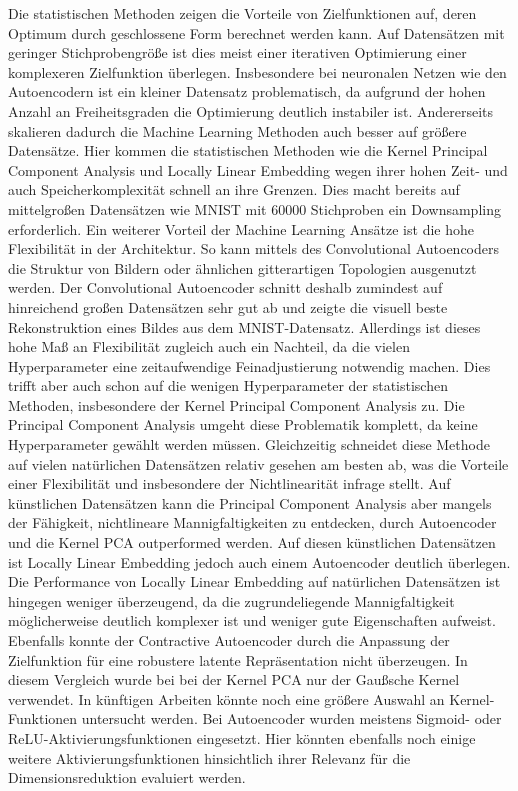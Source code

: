 Die statistischen Methoden zeigen die Vorteile von Zielfunktionen auf, deren Optimum durch
geschlossene Form berechnet werden kann. Auf Datensätzen mit geringer Stichprobengröße ist dies
meist einer iterativen Optimierung einer komplexeren Zielfunktion überlegen. Insbesondere bei
neuronalen Netzen wie den Autoencodern ist ein kleiner Datensatz problematisch, da aufgrund der
hohen Anzahl an Freiheitsgraden die Optimierung deutlich instabiler ist. Andererseits skalieren
dadurch die Machine Learning Methoden auch besser auf größere Datensätze. Hier kommen die
statistischen Methoden wie die Kernel Principal Component Analysis und Locally Linear Embedding
wegen ihrer hohen Zeit- und auch Speicherkomplexität schnell an ihre Grenzen. Dies macht bereits
auf mittelgroßen Datensätzen wie MNIST mit \num{60000} Stichproben ein Downsampling erforderlich.
Ein weiterer Vorteil der Machine Learning Ansätze ist die hohe Flexibilität in der Architektur. So
kann mittels des Convolutional Autoencoders die Struktur von Bildern oder ähnlichen gitterartigen
Topologien ausgenutzt werden. Der Convolutional Autoencoder schnitt deshalb zumindest auf
hinreichend großen Datensätzen sehr gut ab und zeigte die visuell beste Rekonstruktion eines Bildes
aus dem MNIST-Datensatz. Allerdings ist dieses hohe Maß an Flexibilität zugleich auch ein Nachteil,
da die vielen Hyperparameter eine zeitaufwendige Feinadjustierung notwendig machen. Dies trifft
aber auch schon auf die wenigen Hyperparameter der statistischen Methoden, insbesondere der Kernel
Principal Component Analysis zu. Die Principal Component Analysis umgeht diese Problematik
komplett, da keine Hyperparameter gewählt werden müssen. Gleichzeitig schneidet diese Methode auf
vielen natürlichen Datensätzen relativ gesehen am besten ab, was die Vorteile einer Flexibilität
und insbesondere der Nichtlinearität infrage stellt. Auf künstlichen Datensätzen kann die Principal
Component Analysis aber mangels der Fähigkeit, nichtlineare Mannigfaltigkeiten zu entdecken, durch
Autoencoder und die Kernel PCA outperformed werden. Auf diesen künstlichen Datensätzen ist Locally
Linear Embedding jedoch auch einem Autoencoder deutlich überlegen. Die Performance von Locally
Linear Embedding auf natürlichen Datensätzen ist hingegen weniger überzeugend, da die
zugrundeliegende Mannigfaltigkeit möglicherweise deutlich komplexer ist und weniger gute
Eigenschaften aufweist. Ebenfalls konnte der Contractive Autoencoder durch die Anpassung der
Zielfunktion für eine robustere latente Repräsentation nicht überzeugen. In diesem Vergleich wurde
bei bei der Kernel PCA nur der Gaußsche Kernel verwendet. In künftigen Arbeiten könnte noch eine
größere Auswahl an Kernel-Funktionen untersucht werden. Bei Autoencoder wurden meistens Sigmoid-
oder ReLU-Aktivierungsfunktionen eingesetzt. Hier könnten ebenfalls noch einige weitere
Aktivierungsfunktionen hinsichtlich ihrer Relevanz für die Dimensionsreduktion evaluiert werden.

